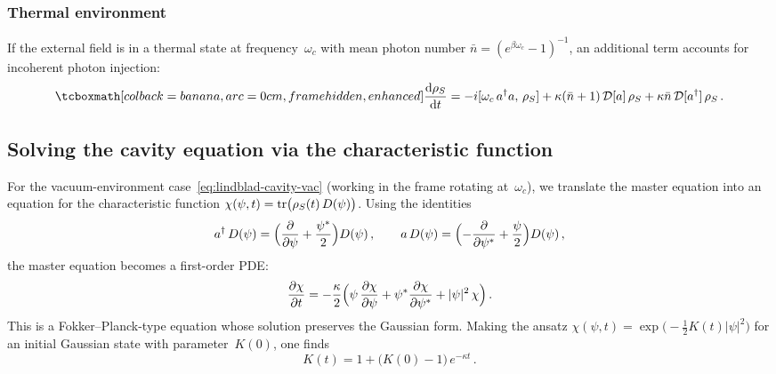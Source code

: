 \subsubsection{Thermal environment}

If the external field is in a thermal state at frequency~$\omega_c$
with mean photon number $\bar{n} = (e^{\beta\omega_c} - 1)^{-1}$,
an additional term accounts for incoherent photon injection:
\begin{equation}\label{eq:lindblad-cavity-thermal}
  \eqbox{%
  \frac{\dd\rho_S}{\dd t}
  = -i[\omega_c\, a^\adj a,\,\rho_S]
    + \kappa(\bar{n}+1)\,\mathcal{D}[a]\,\rho_S
    + \kappa\bar{n}\,\mathcal{D}[a^\adj]\,\rho_S}\,.
\end{equation}

\subsection{Solving the cavity equation via the characteristic
function}\label{sec:cavity-char-fn}

For the vacuum-environment case~\eqref{eq:lindblad-cavity-vac}
(working in the frame rotating at~$\omega_c$), we translate the master
equation into an equation for the characteristic function
$\chi(\psi,t) = \operatorname{tr}\bigl(\rho_S(t)\, D(\psi)\bigr)$.  Using the
identities
\begin{equation}\label{eq:D-deriv-identities}
  a^\dagger\, D(\psi)
  = \Bigl(\frac{\partial}{\partial\psi} + \frac{\psi^*}{2}\Bigr)D(\psi)\,,
  \qquad
  a\, D(\psi)
  = \Bigl(-\frac{\partial}{\partial\psi^*} + \frac{\psi}{2}\Bigr)D(\psi)\,,
\end{equation}
the master equation becomes a first-order PDE:
\begin{equation}\label{eq:chi-pde}
  \frac{\partial\chi}{\partial t}
  = -\frac{\kappa}{2}\Bigl(
      \psi\,\frac{\partial\chi}{\partial\psi}
    + \psi^*\frac{\partial\chi}{\partial\psi^*}
    + \lvert\psi\rvert^2\,\chi
    \Bigr)\,.
\end{equation}
This is a Fokker--Planck-type equation whose solution preserves the
Gaussian form.  Making the ansatz
$\chi(\psi,t) = \exp\!\bigl(-\tfrac{1}{2}K(t)\lvert\psi\rvert^2\bigr)$
for an initial Gaussian state with parameter~$K(0)$, one finds
\begin{equation}\label{eq:chi-solution}
  K(t)
  = 1 + \bigl(K(0) - 1\bigr)\,e^{-\kappa t}\,.
\end{equation}

